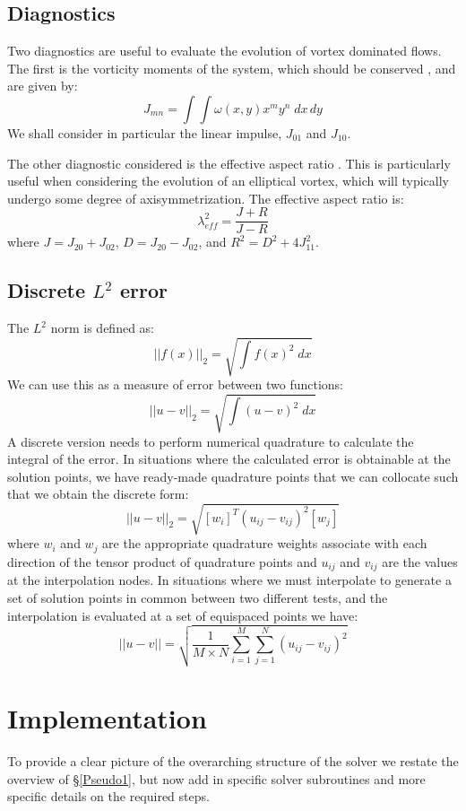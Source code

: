 \documentclass[letterpaper,12pt]{report}
\newcommand{\be}{\begin{equation}}
\newcommand{\ee}{\end{equation}}
\begin{document}
\section{Diagnostics}
Two diagnostics are useful to evaluate the evolution of vortex dominated flows. The first is the vorticity moments of the system, which should be conserved \cite{Koum1997}, and are given by:
\be J_{mn}=\int\int \omega(x,y)x^my^n \; dx\,dy \ee
We shall consider in particular the linear impulse, $J_{01}$ and $J_{10}$.

The other diagnostic considered is the effective aspect ratio \cite{Koum1997}. This is particularly useful when considering the evolution of an elliptical vortex, which will typically undergo some degree of axisymmetrization. The effective aspect ratio is:
\be \lambda_{eff}^2 = \frac{J+R}{J-R} \ee
where $J=J_{20}+J_{02}$, $D=J_{20}-J_{02}$, and $R^2=D^2+4J_{11}^2$.

\section{Discrete $L^2$ error}
The $L^2$ norm is defined as:
\be ||f(x)||_2 = \sqrt{\int f(x)^2 \; dx} \ee
We can use this as a measure of error between two functions:
\be ||u-v||_2 = \sqrt{\int (u-v)^2 \; dx} \ee
A discrete version needs to perform numerical quadrature to calculate the integral of the error. In situations where the calculated error is obtainable at the solution points, we have ready-made quadrature points that we can collocate such that we obtain the discrete form:
\be ||u-v||_2 = \sqrt{[w_i]^T(u_{ij}-v_{ij})^2[w_j]} \ee
where $w_i$ and $w_j$ are the appropriate quadrature weights associate with each direction of the tensor product of quadrature points and $u_{ij}$ and $v_{ij}$ are the values at the interpolation nodes. In situations where we must interpolate to generate a set of solution points in common between two different tests, and the interpolation is evaluated at a set of equispaced points we have:
\be ||u-v|| =\sqrt{\frac{1}{M\times N} \sum_{i=1}^M \sum_{j=1}^N (u_{ij}-v_{ij})^2 }\ee

\chapter{Implementation}
To provide a clear picture of the overarching structure of the solver we restate the overview of \S\ref{Pseudo1}, but now add in specific solver subroutines and more specific details on the required steps.
\end{document}
